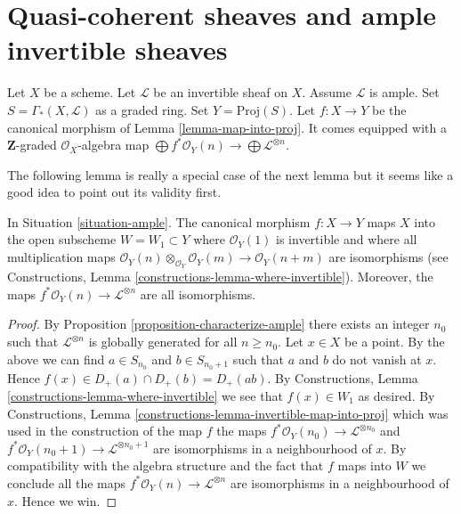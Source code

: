 \section{Quasi-coherent sheaves and ample invertible sheaves}
\label{section-ample-quasi-coherent}


\begin{situation}
\label{situation-ample}
Let $X$ be a scheme.
Let $\mathcal{L}$ be an invertible sheaf on $X$.
Assume $\mathcal{L}$ is ample.
Set $S = \Gamma_*(X, \mathcal{L})$ as a graded ring.
Set $Y = \text{Proj}(S)$.
Let $f : X \to Y$ be the canonical morphism of Lemma \ref{lemma-map-into-proj}.
It comes equipped with a $\mathbf{Z}$-graded $\mathcal{O}_X$-algebra map
$\bigoplus f^*\mathcal{O}_Y(n) \to \bigoplus \mathcal{L}^{\otimes n}$.
\end{situation}

\noindent
The following lemma is really a special case of the next lemma
but it seems like a good idea to point out its validity first.

\begin{lemma}
\label{lemma-ample-gcd-is-one}
In Situation \ref{situation-ample}.
The canonical morphism $f : X \to Y$
maps $X$ into the open subscheme $W = W_1 \subset Y$
where $\mathcal{O}_Y(1)$ is invertible and where
all multiplication maps
$\mathcal{O}_Y(n) \otimes_{\mathcal{O}_Y} \mathcal{O}_Y(m) \to
\mathcal{O}_Y(n + m)$
are isomorphisms (see
Constructions, Lemma \ref{constructions-lemma-where-invertible}).
Moreover, the maps $f^*\mathcal{O}_Y(n) \to \mathcal{L}^{\otimes n}$
are all isomorphisms.
\end{lemma}

\begin{proof}
By Proposition \ref{proposition-characterize-ample} there exists an integer
$n_0$ such that $\mathcal{L}^{\otimes n}$ is globally generated for all
$n \geq n_0$. Let $x \in X$ be a point. By the above we can find
$a \in S_{n_0}$ and $b \in S_{n_0 + 1}$ such that
$a$ and $b$ do not vanish at $x$. Hence
$f(x) \in D_{+}(a) \cap D_{+}(b) = D_{+}(ab)$. By
Constructions, Lemma \ref{constructions-lemma-where-invertible}
we see that $f(x) \in W_1$ as desired. By
Constructions, Lemma \ref{constructions-lemma-invertible-map-into-proj}
which was used in the construction of the map $f$
the maps
$f^*\mathcal{O}_Y(n_0) \to \mathcal{L}^{\otimes n_0}$ and
$f^*\mathcal{O}_Y(n_0 + 1) \to \mathcal{L}^{\otimes n_0 + 1}$
are isomorphisms in a neighbourhood of $x$. By compatibility with
the algebra structure and the fact that $f$ maps into $W$
we conclude all the maps
$f^*\mathcal{O}_Y(n) \to \mathcal{L}^{\otimes n}$ are isomorphisms
in a neighbourhood of $x$. Hence we win.
\end{proof}

